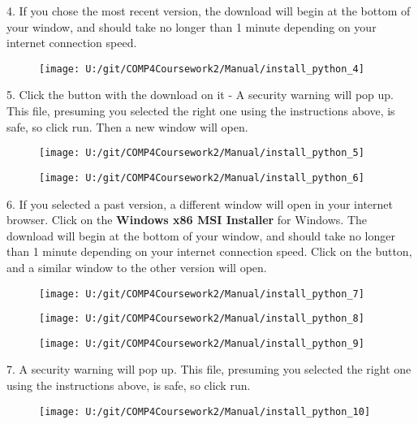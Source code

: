 4. If you chose the most recent version, the download will begin at the bottom of your window, and should take no longer than 1 minute depending on your internet connection speed.

\begin{figure}[H]
    \texttt{[image: U:/git/COMP4Coursework2/Manual/install\_python\_4]}
\end{figure}

5. Click the button with the download on it - A security warning will pop up. This file, presuming you selected the right one using the instructions above, is safe, so click run. Then a new window will open.

\begin{figure}[H]
    \texttt{[image: U:/git/COMP4Coursework2/Manual/install\_python\_5]}
\end{figure}

\begin{figure}[H]
    \texttt{[image: U:/git/COMP4Coursework2/Manual/install\_python\_6]}
\end{figure}

6. If you selected a past version, a different window will open in your internet browser. Click on the \textbf{Windows x86 MSI Installer} for Windows. The download will begin at the bottom of your window, and should take no longer than 1 minute depending on your internet connection speed. Click on the button, and a similar window to the other version will open.

\begin{figure}[H]
    \texttt{[image: U:/git/COMP4Coursework2/Manual/install\_python\_7]}
\end{figure}

\begin{figure}[H]
    \texttt{[image: U:/git/COMP4Coursework2/Manual/install\_python\_8]}
\end{figure}

\begin{figure}[H]
    \texttt{[image: U:/git/COMP4Coursework2/Manual/install\_python\_9]}
\end{figure}

7. A security warning will pop up. This file, presuming you selected the right one using the instructions above, is safe, so click run.

\begin{figure}[H]
    \texttt{[image: U:/git/COMP4Coursework2/Manual/install\_python\_10]}
\end{figure}

